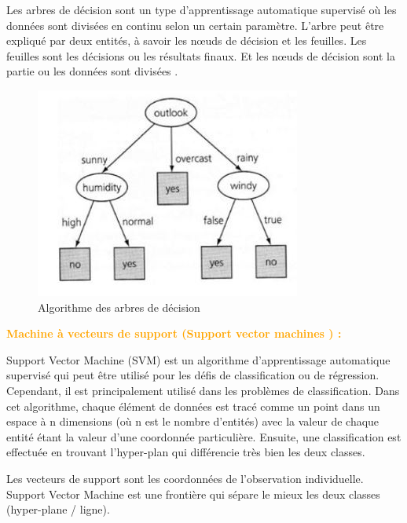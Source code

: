 Les arbres de décision sont un type d'apprentissage automatique supervisé où les données sont divisées en continu selon un certain paramètre. L'arbre peut être expliqué par deux entités, à savoir les nœuds de décision et les feuilles. Les feuilles sont les décisions ou les résultats finaux. Et les nœuds de décision sont la partie ou les données sont divisées \cite{11}.

\begin{figure}[H]
\begin{center}
\includegraphics[width=0.8\linewidth]{images/treedecision.JPG}
\end{center}
\caption{Algorithme des arbres de décision}
\label{fig:9}
\end{figure}


\textcolor{Orange}{\textbf{Machine à vecteurs de support (Support vector machines ) : }}

Support Vector Machine (SVM) est un algorithme d'apprentissage automatique supervisé qui peut être utilisé pour les défis de classification ou de régression. Cependant, il est principalement utilisé dans les problèmes de classification. Dans cet algorithme, chaque élément de données est tracé comme un point dans un espace à n dimensions (où n est le nombre d'entités) avec la valeur de chaque entité étant la valeur d'une coordonnée particulière. Ensuite, une classification est effectuée en trouvant l'hyper-plan qui différencie très bien les deux classes.

Les vecteurs de support sont les coordonnées de l'observation individuelle. Support Vector Machine est une frontière qui sépare le mieux les deux classes (hyper-plane / ligne).


